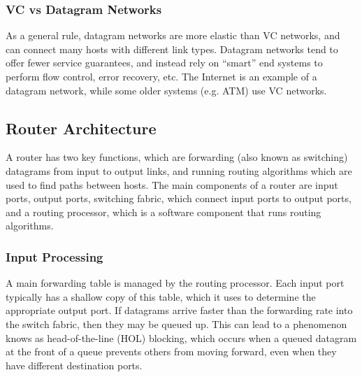 \documentclass[12pt,titlepage]{article}
\begin{document}
      \subsubsection{VC vs Datagram Networks}
        As a general rule, datagram networks are more elastic than VC networks, and can connect many hosts with different link types. Datagram networks
        tend to offer fewer service guarantees, and instead rely on ``smart'' end systems to perform flow control, error recovery, etc. The Internet is an
        example of a datagram network, while some older systems (e.g. ATM) use VC networks.

    \subsection{Router Architecture}
      A router has two key functions, which are forwarding (also known as switching) datagrams from input to output links, and running routing algorithms
      which are used to find paths between hosts. The main components of a router are input ports, output ports, switching fabric, which connect input
      ports to output ports, and a routing processor, which is a software component that runs routing algorithms.

      \subsubsection{Input Processing}
        A main forwarding table is managed by the routing processor. Each input port typically has a shallow copy of this table, which it uses to determine
        the appropriate output port. If datagrams arrive faster than the forwarding rate into the switch fabric, then they may be queued up. This can lead
        to a phenomenon knows as head-of-the-line (HOL) blocking, which occurs when a queued datagram at the front of a queue prevents others from moving
        forward, even when they have different destination ports.
\end{document}
